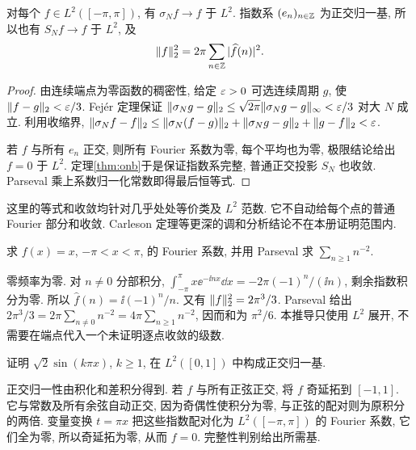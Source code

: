 \begin{theorem}\label{thm:fouriercomplete}
对每个 $f\in L^2([-\pi,\pi])$, 有 $\sigma_Nf\to f$ 于 $L^2$. 指数系 $(e_n)_{n\in\mathbb Z}$ 为正交归一基, 所以也有 $S_Nf\to f$ 于 $L^2$, 及
\[
\lVert f\rVert_2^2=2\pi\sum_{n\in\mathbb Z}|\widehat f(n)|^2.
\]
\end{theorem}
\begin{proof}
由连续端点为零函数的稠密性, 给定 $\varepsilon>0$ 可选连续周期 $g$, 使 $\lVert f-g\rVert_2<\varepsilon/3$. Fejér 定理保证 $\lVert \sigma_Ng-g\rVert_2\le\sqrt{2\pi}\lVert \sigma_Ng-g\rVert_\infty<\varepsilon/3$ 对大 $N$ 成立. 利用收缩界,
$\lVert \sigma_Nf-f\rVert_2\le\lVert \sigma_N(f-g)\rVert_2+\lVert \sigma_Ng-g\rVert_2+\lVert g-f\rVert_2<\varepsilon$.

若 $f$ 与所有 $e_n$ 正交, 则所有 Fourier 系数为零, 每个平均也为零, 极限结论给出 $f=0$ 于 $L^2$. 定理\ref{thm:onb}于是保证指数系完整, 普通正交投影 $S_N$ 也收敛. Parseval 乘上系数归一化常数即得最后恒等式.
\end{proof}
这里的等式和收敛均针对几乎处处等价类及 $L^2$ 范数. 它不自动给每个点的普通 Fourier 部分和收敛. Carleson 定理等更深的调和分析结论不在本册证明范围内.

\begin{exercise}\label{legacy:ch09:exercise1}
求 $f(x)=x$, $-\pi<x<\pi$, 的 Fourier 系数, 并用 Parseval 求 $\sum_{n\ge1}n^{-2}$.
\end{exercise}
\begin{solution}
零频率为零. 对 $n\ne0$ 分部积分,
$\int_{-\pi}^\pi x\ee^{-\ii nx}\dd x=-2\pi(-1)^n/(\ii n)$, 剩余指数积分为零. 所以 $\widehat f(n)=\ii(-1)^n/n$. 又有 $\lVert f\rVert_2^2=2\pi^3/3$. Parseval 给出 $2\pi^3/3=2\pi\sum_{n\ne0}n^{-2}=4\pi\sum_{n\ge1}n^{-2}$, 因而和为 $\pi^2/6$. 本推导只使用 $L^2$ 展开, 不需要在端点代入一个未证明逐点收敛的级数.
\end{solution}

\begin{exercise}\label{legacy:ch09:exercise2}
证明 $\sqrt2\sin(k\pi x)$, $k\ge1$, 在 $L^2([0,1])$ 中构成正交归一基.
\end{exercise}
\begin{solution}
正交归一性由积化和差积分得到. 若 $f$ 与所有正弦正交, 将 $f$ 奇延拓到 $[-1,1]$. 它与常数及所有余弦自动正交, 因为奇偶性使积分为零, 与正弦的配对则为原积分的两倍. 变量变换 $t=\pi x$ 把这些指数配对化为 $L^2([-\pi,\pi])$ 的 Fourier 系数, 它们全为零, 所以奇延拓为零, 从而 $f=0$. 完整性判别给出所需基.
\end{solution}
